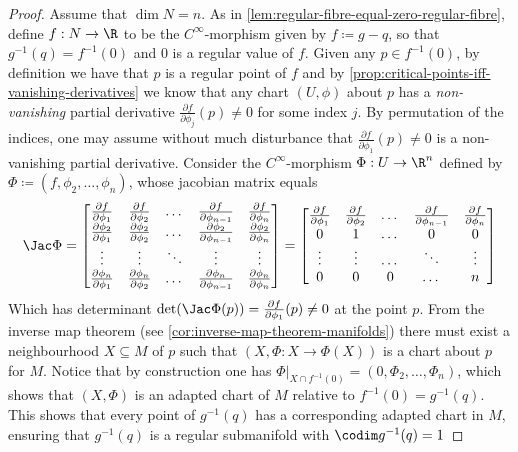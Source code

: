 \begin{proof}
Assume that \(\dim N = n\). As in
\cref{lem:regular-fibre-equal-zero-regular-fibre}, define \(f: N \to \R\) to be
the \(C^{\infty}\)-morphism given by \(f \coloneq g - q\), so that
\(g^{-1}(q) = f^{-1}(0)\) and \(0\) is a regular value of \(f\). Given any
\(p \in f^{-1}(0)\), by definition we have that \(p\) is a regular point of
\(f\) and by \cref{prop:critical-points-iff-vanishing-derivatives} we know that
any chart \((U, \phi)\) about \(p\) has a \emph{non-vanishing} partial
derivative \(\frac{\partial f}{\partial \phi_j}(p) \neq 0\) for some index
\(j\). By permutation of the indices, one may assume without much disturbance
that \(\frac{\partial f}{\partial \phi_1}(p) \neq 0\) is a non-vanishing partial
derivative. Consider the \(C^{\infty}\)-morphism \(\Phi: U \to \R^n\) defined by
\(\Phi \coloneq (f, \phi_2, \dots, \phi_n)\), whose jacobian matrix equals
\[
\Jac \Phi =
\begin{bmatrix}
\frac{\partial f}{\partial \phi_1}
&\frac{\partial f}{\partial \phi_2}
&\dots
&\frac{\partial f}{\partial \phi_{n-1}}
&\frac{\partial f}{\partial \phi_n}
\\
\frac{\partial \phi_2}{\partial \phi_1}
&\frac{\partial \phi_2}{\partial \phi_2}
&\dots
&\frac{\partial \phi_2}{\partial \phi_{n-1}}
&\frac{\partial \phi_2}{\partial \phi_n}
\\
\vdots &\vdots &\ddots &\vdots &\vdots
\\
\frac{\partial \phi_n}{\partial \phi_1}
&\frac{\partial \phi_n}{\partial \phi_2}
&\dots
&\frac{\partial \phi_n}{\partial \phi_{n-1}}
&\frac{\partial \phi_n}{\partial \phi_n}
\end{bmatrix}
=
\begin{bmatrix}
\frac{\partial f}{\partial \phi_1}
&\frac{\partial f}{\partial \phi_2}
&\dots
&\frac{\partial f}{\partial \phi_{n-1}}
&\frac{\partial f}{\partial \phi_n}
\\
0 &1 &\dots &0 &0
\\
\vdots &\vdots &\dots &\ddots &\vdots
\\
0 &0 &0 &\dots &n
\end{bmatrix}
\]
Which has determinant
\(\det(\Jac \Phi(p)) = \frac{\partial f}{\partial \phi_1}(p) \neq 0\) at the
point \(p\). From the inverse map theorem (see
\cref{cor:inverse-map-theorem-manifolds}) there must exist a neighbourhood
\(X \subseteq M\) of \(p\) such that \((X, \Phi: X \to \Phi(X))\) is a chart
about \(p\) for \(M\). Notice that by construction one has
\(\Phi|_{X \cap f^{-1}(0)} = (0, \Phi_2, \dots, \Phi_n)\), which shows that
\((X, \Phi)\) is an adapted chart of \(M\) relative to
\(f^{-1}(0) = g^{-1}(q)\). This shows that every point of \(g^{-1}(q)\) has a
corresponding adapted chart in \(M\), ensuring that \(g^{-1}(q)\) is a regular
submanifold with \(\codim g^{-1}(q) = 1\)
\end{proof}

